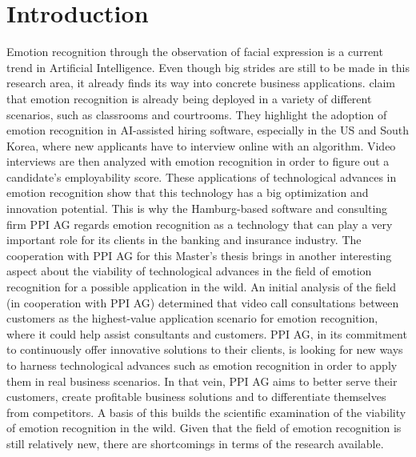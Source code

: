 
\chapter{Introduction}

Emotion recognition through the observation of facial expression is a current trend \citep{Chen:2020:EmotionAI}  \citep{Handrich:2020:SimultaneousPredVA} in Artificial Intelligence. Even though big strides are still to be made in this research area, it already finds its way into concrete business applications. \citet{Chen:2020:EmotionAI} claim that emotion recognition is already being deployed in a variety of different scenarios, such as classrooms and courtrooms. They highlight the adoption of emotion recognition in AI-assisted hiring software, especially in the US and South Korea, where new applicants have to interview online with an algorithm. Video interviews are then analyzed with emotion recognition in order to figure out a candidate's employability score.
\newline\newline
These applications of technological advances in emotion recognition show that this technology has a big optimization and innovation potential. This is why the Hamburg-based software and consulting firm PPI AG regards emotion recognition as a technology that can play a very important role for its clients in the banking and insurance industry. The cooperation with PPI AG for this Master's thesis brings in another interesting aspect about the viability of technological advances in the field of emotion recognition for a possible application in the wild. An initial analysis of the field (in cooperation with PPI AG) determined that video call consultations between customers as the highest-value application scenario for emotion recognition, where it could help assist consultants and customers.
\newline\newline
PPI AG, in its commitment to continuously offer innovative solutions to their clients, is looking for new ways to harness technological advances such as emotion recognition in order to apply them in real business scenarios. In that vein, PPI AG aims to better serve their customers, create profitable business solutions and to differentiate themselves from competitors. A basis of this builds the scientific examination of the viability of emotion recognition in the wild. Given that the field of emotion recognition is still relatively new, there are shortcomings in terms of the research available.
